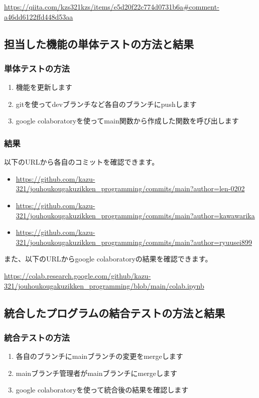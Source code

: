 \documentclass[a4paper,11pt]{jsarticle}
\begin{document}
\url{https://qiita.com/kzs321kzs/items/e5d20f22c774d0731b6a#comment-a46dd6122ffd448d53aa}

\newpage

\subsection*{担当した機能の単体テストの方法と結果}
\subsubsection*{単体テストの方法}
\begin{enumerate}
    \item 機能を更新します
    \item gitを使ってdevブランチなど各自のブランチにpushします
    \item google colaboratoryを使ってmain関数から作成した関数を呼び出します
\end{enumerate}

\subsubsection*{結果}
以下のURLから各自のコミットを確認できます。
\begin{itemize}
    \item \url{https://github.com/kazu-321/jouhoukougakuzikken_programming/commits/main?author=len-0202}
    \item \url{https://github.com/kazu-321/jouhoukougakuzikken_programming/commits/main?author=kawawarika}
    \item \url{https://github.com/kazu-321/jouhoukougakuzikken_programming/commits/main?author=ryuusei899}
\end{itemize}

また、以下のURLからgoogle colaboratoryの結果を確認できます。

\url{https://colab.research.google.com/github/kazu-321/jouhoukougakuzikken_programming/blob/main/colab.ipynb}

\subsection*{統合したプログラムの結合テストの方法と結果}
\subsubsection*{統合テストの方法}
\begin{enumerate}
    \item 各自のブランチにmainブランチの変更をmergeします
    \item mainブランチ管理者がmainブランチにmergeします
    \item google colaboratoryを使って統合後の結果を確認します
\end{enumerate}
\end{document}
